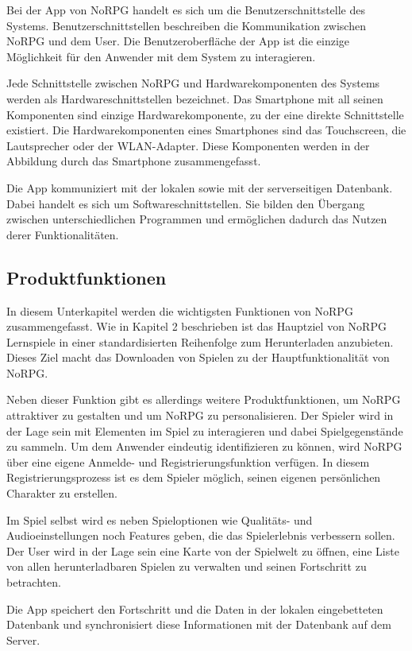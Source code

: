 		Bei der App von NoRPG handelt es sich um die Benutzerschnittstelle des Systems. Benutzerschnittstellen beschreiben die Kommunikation zwischen NoRPG und dem User. Die Benutzeroberfläche der App ist die einzige Möglichkeit für den Anwender mit dem System zu interagieren.
		
		Jede Schnittstelle zwischen NoRPG und Hardwarekomponenten des Systems werden als Hardwareschnittstellen bezeichnet. Das Smartphone mit all seinen Komponenten sind einzige Hardwarekomponente, zu der eine direkte  Schnittstelle existiert. Die Hardwarekomponenten eines Smartphones sind das Touchscreen, die Lautsprecher oder der WLAN-Adapter. Diese Komponenten werden in der Abbildung durch das Smartphone zusammengefasst.
		
		Die App kommuniziert mit der lokalen sowie mit der serverseitigen Datenbank. Dabei handelt es sich um Softwareschnittstellen. Sie bilden den Übergang zwischen unterschiedlichen Programmen und ermöglichen dadurch das Nutzen derer Funktionalitäten. 

	\subsection{Produktfunktionen}
		In diesem Unterkapitel werden die wichtigsten Funktionen von NoRPG zusammengefasst. Wie in Kapitel 2 beschrieben ist das Hauptziel von NoRPG Lernspiele in einer standardisierten Reihenfolge zum Herunterladen anzubieten. Dieses Ziel macht das Downloaden von Spielen zu der Hauptfunktionalität von NoRPG. 
		
		Neben dieser Funktion gibt es allerdings weitere Produktfunktionen, um NoRPG attraktiver zu gestalten und um NoRPG zu personalisieren. Der Spieler wird in der Lage sein mit Elementen im Spiel zu interagieren und dabei Spielgegenstände zu sammeln. Um dem Anwender eindeutig identifizieren zu können, wird NoRPG über eine eigene Anmelde- und Registrierungsfunktion verfügen. In diesem Registrierungsprozess ist es dem Spieler möglich, seinen eigenen persönlichen Charakter zu erstellen.
		
		Im Spiel selbst wird es neben Spieloptionen wie Qualitäts- und Audioeinstellungen noch Features geben, die das Spielerlebnis verbessern sollen. Der User wird in der Lage sein eine Karte von der Spielwelt zu öffnen, eine Liste von allen herunterladbaren Spielen zu verwalten und seinen Fortschritt zu betrachten.
		
		Die App speichert den Fortschritt und die Daten in der lokalen eingebetteten Datenbank und synchronisiert diese Informationen mit der Datenbank auf dem Server.
	
